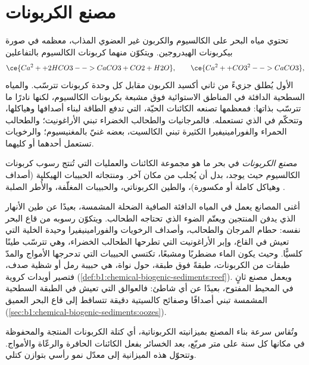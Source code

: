 \section{مصنع الكربونات}\label{sec:b1:chemical-biogenic-sediments:factory}

تحتوي مياه البحر على الكالسيوم والكربون غير العضوي المذاب، معظمه في صورة بيكربونات الهيدروجين. ويتكوّن منهما كربونات الكالسيوم بالتفاعلين
\[
\ce{Ca^2+ + 2 HCO3- -> CaCO3 + CO2 + H2O}, \qquad
\ce{Ca^2+ + CO3^2- -> CaCO3},
\]
الأول يُطلق جزيءً من ثاني أكسيد الكربون مقابل كل وحدة كربونات تترسّب. والمياه السطحية الدافئة في المناطق الاستوائية فوق مشبعة بكربونات الكالسيوم، لكنها نادرًا ما تترسّب بذاتها: فمعظمها تصنعه الكائنات الحيّة، التي تدفع الطاقة لبناء أصدافها وهياكلها، وتتحكّم في  الذي تستعمله. فالمرجانيات والطحالب الخضراء تبني الأراغونيت؛ والطحالب الحمراء والفورامينيفيرا الكثيرة تبني الكالسيت، بعضه غنيّ بالمغنيسيوم؛ والرخويات تستعمل أحدهما أو كليهما.

\begin{definition}\label{def:b1:chemical-biogenic-sediments:factory}
\emph{مصنع الكربونات} في بحر ما هو مجموعة الكائنات والعمليات التي تُنتج رسوب كربونات الكالسيوم حيث يوجد، بدل أن يُجلب من مكان آخر. ومنتجاته الحبيبات الهيكلية (أصداف وهياكل كاملة أو مكسورة)، والطين الكربوناتي، والحبيبات المغلّفة، والأُطر الصلبة .
\end{definition}

أغنى المصانع يعمل في المياه الدافئة الصافية الضحلة المشمسة، بعيدًا عن طين الأنهار الذي يدفن المنتجين ويعتّم الضوء الذي تحتاجه الطحالب. ويتكوّن رسوبه من قاع البحر نفسه: حطام المرجان والطحالب، وأصداف الرخويات والفورامينيفيرا وحيدة الخلية التي تعيش في القاع، وإبر الأراغونيت التي تطرحها الطحالب الخضراء، وهي تترسّب طينًا كلسيًّا. وحيث يكون الماء مضطربًا ومشبعًا، تكتسي الحبيبات التي تدحرجها الأمواج والمدّ طبقات من الكربونات، طبقةً فوق طبقة، حول نواة، هي حبيبة رمل أو شظية صدف، فتصير أويدات كروية (\cref{def:b1:chemical-biogenic-sediments:reef}). ويعمل مصنع ثانٍ في المحيط المفتوح، بعيدًا عن أي شاطئ: فالعوالق التي تعيش في الطبقة السطحية المشمسة تبني أصدافًا وصفائح كالسيتية دقيقة تتساقط إلى قاع البحر العميق (\cref{sec:b1:chemical-biogenic-sediments:oozes}).

وتُقاس سرعة بناء المصنع بميزانيته الكربوناتية، أي كتلة الكربونات المنتجة والمحفوظة في مكانها كل سنة على متر مربّع، بعد الخسائر بفعل الكائنات الحافرة والرعّاة والأمواج. وتتحوّل هذه الميزانية إلى معدّل نمو رأسي بتوازن كتلي.

